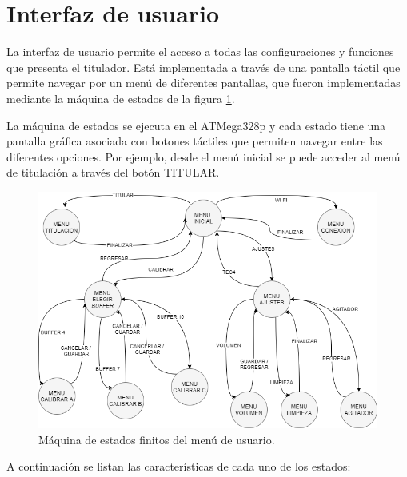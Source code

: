 \section{Interfaz de usuario}

La interfaz de usuario permite el acceso a todas las configuraciones y funciones que presenta el titulador. Está implementada a través de una pantalla táctil que permite navegar por un menú de diferentes pantallas, que fueron implementadas mediante la máquina de estados de la figura \ref{fig:MEFmenu}.

La máquina de estados se ejecuta en el ATMega328p y cada estado tiene una pantalla gráfica asociada con botones táctiles que permiten navegar entre las diferentes opciones. Por ejemplo, desde el menú inicial se puede acceder al menú de titulación a través del botón TITULAR.

\begin{figure}[htbp]
	\centering
	\includegraphics[width=1.0\textwidth]{./Figures/MEFmenu.png}
	\caption{Máquina de estados finitos del menú de usuario.}
	\label{fig:MEFmenu}
\end{figure}

A continuación se listan las características de cada uno de los estados:

